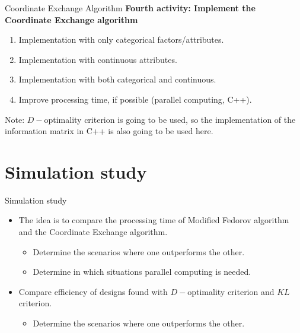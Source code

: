 \documentclass[11pt,t]{beamer}
\begin{document}
\begin{frame}[fragile]{Coordinate Exchange Algorithm}
\textbf{Fourth activity: Implement the Coordinate Exchange algorithm}
\begin{enumerate}
	\item \textcolor{kul-blue}{Implementation with only categorical factors/attributes.}
	\item Implementation with continuous attributes.
	\item Implementation with both categorical and continuous.
	\item Improve processing time, if possible (parallel computing, C++).
\end{enumerate}
\begin{alertblock}{Note:}
	$D-$optimality criterion is going to be used, so the implementation of the information matrix in C++ is also going to be used here.
\end{alertblock}
\end{frame}

\section{Simulation study}
\begin{frame}[fragile]{Simulation study}
	\begin{itemize}
		\item The idea is to compare the processing time of Modified Fedorov algorithm and the Coordinate Exchange algorithm.
		\begin{itemize}
			\item Determine the scenarios where one outperforms the other.
			\item Determine in which situations parallel computing is needed.
		\end{itemize}
		\item Compare efficiency of designs found with $D-$optimality criterion and $KL$ criterion.
		\begin{itemize}
			\item Determine the scenarios where one outperforms the other.
		\end{itemize}
	\end{itemize}
\end{frame}
\end{document}
